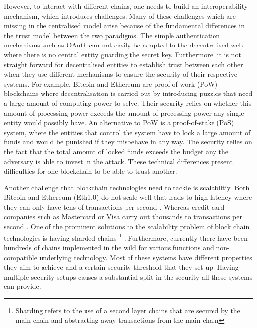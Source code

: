 However, to interact with different chains, one needs to build an interoperability mechanism, which introduces challenges. Many of these challenges which are missing in the centralised model arise because of the fundamental differences in the trust model between the two paradigms. The simple authentication mechanisms such as OAuth \cite{hardt2012oauth} can not easily be adapted to the decentralised web where there is no central entity guarding the secret key. Furthermore, it is not straight forward for decentralised entities to establish trust between each other when they use different mechanisms to ensure the security of their respective systems. For example, Bitcoin\cite{} and Ethereum\cite{} are proof-of-work (PoW) blockchains where decentralisation is carried out by introducing puzzles that need a large amount of computing power to solve. Their security relies on whether this amount of processing power exceeds the amount of processing power any single entity would possibly have. An alternative to PoW is a proof-of-stake (PoS) system, where the entities that control the system have to lock a large amount of funds and would be punished if they misbehave in any way. The security relies on the fact that the total amount of locked funds exceeds the budget any the adversary is able to invest in the attack. These technical differences present difficulties for one blockchain to be able to trust another.

Another challenge that blockchain technologies need to tackle is scalabiltiy. Both Bitcoin and Ethereum (Eth1.0) do not scale well that leads to high latency where they can only have tens of transactions per second \cite{scaling} \cite{}. Whereas credit card companies such as Mastercard or Visa carry out thousands to transactions per second \cite{}. One of the prominent solutions to the scalability problem of block chain technologies is having sharded chains \footnote{Sharding refers to the use of a second layer chains that are secured by the main chain and abstracting away transactions from the main chain} \cite{sharding} . %
Furthermore, currently there have been hundreds of chains implemented in the wild for various functions and non-compatible underlying technology. Most of these systems have different properties they aim to achieve and a certain security threshold that they set up. Having multiple security setups causes a substantial split in the security all these systems can provide. 

